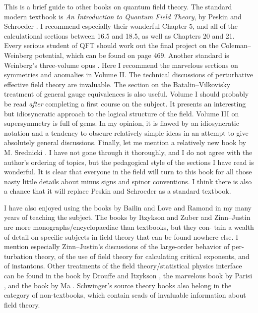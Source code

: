 
This is a brief guide to other books on quantum field theory. The standard modern
textbook is \emph{An Introduction to Quantum Field Theory}, by Peskin and Schroeder \cite{banks-ref-33}.
I recommend especially their wonderful Chapter 5, and all of the calculational sections
between 16.5 and 18.5, as well as Chapters 20 and 21. Every serious student of QFT
should work out the final project on the Coleman--Weinberg potential, which can be
found on page 469. Another standard is Weinberg's three-volume opus \cite{banks-ref-131}.
Here I recommend the marvelous sections on symmetries and anomalies in Volume II. The
technical discussions of perturbative effective field theory are invaluable. The section on
the Batalin--Vilkovisky treatment of general gauge equivalences is also useful. Volume I
should probably be read \emph{after} completing a first course on the subject. It presents an
interesting but idiosyncratic approach to the logical structure of the field. Volume III on
supersymmetry is full of gems. In my opinion, it is flawed by an idiosyncratic notation
and a tendency to obscure relatively simple ideas in an attempt to give absolutely general
discussions. Finally, let me mention a relatively new book by M. Srednicki \cite{banks-ref-168}. I have
not gone through it thoroughly, and I do not agree with the author's ordering of
topics, but the pedagogical style of the sections I have read is wonderful. It is clear that
everyone in the field will turn to this book for all those nasty little details about minus
signs and spinor conventions. I think there is also a chance that it will replace Peskin
and Schroeder as a standard textbook.

I have also enjoyed using the books by Bailin and Love \cite{banks-ref-169} and Ramond \cite{banks-ref-170} in
my many years of teaching the subject. The books by Itzykson and Zuber \cite{banks-ref-171} and
Zinn--Justin \cite{banks-ref-111} are more monographs/encyclopaediae than textbooks, but they con-
tain a wealth of detail on specific subjects in field theory that can be found nowhere
else. I mention especially Zinn--Justin's discussions of the large-order behavior of per-
turbation theory, of the use of field theory for calculating critical exponents, and of
instantons. Other treatments of the field theory/statistical physics interface can be found
in the book by Drouffe and Itzykson \cite{banks-ref-172}, the marvelous book by Parisi \cite{banks-ref-173}, and the
book by Ma \cite{banks-ref-174}. Schwinger's source theory books \cite{banks-ref-175} also belong in the category
of non-textbooks, which contain scads of invaluable information about field theory.

